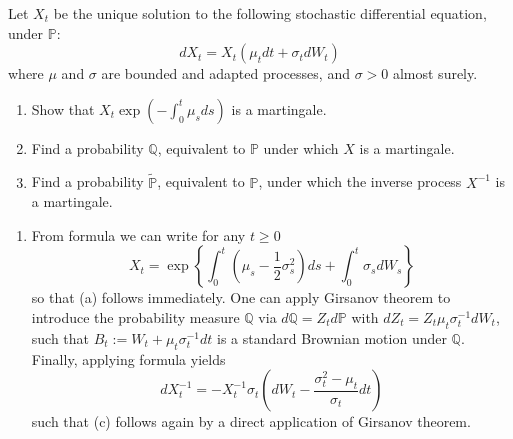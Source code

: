 \documentclass[12pt,a4paper]{exam}
\begin{document}
\begin{questions}
\begin{solution}
\begin{solution}
\question Let $X_t$ be the unique solution to the following stochastic differential equation, under $\mathbb{P}$:
\begin{equation*}
dX_t = X_t(\mu_t dt + \sigma_t dW_t)
\end{equation*}
where $\mu$ and $\sigma$ are bounded and adapted processes, and $\sigma >0$ almost surely.
\begin{enumerate}[label=(\alph*),font=\itshape]
\item Show that $X_t\exp(-\int_0^t \mu_s ds)$ is a martingale.
\item Find a probability $\mathbb{Q}$, equivalent to $\mathbb{P}$ under which $X$ is a martingale.
\item Find a probability $\tilde{\mathbb{P}}$, equivalent to $\mathbb{P}$, under which the inverse process $X^{-1}$ is a martingale.
\end{enumerate}
\fillwithlines{3cm}
\begin{solution}
\begin{enumerate}[label=(\alph*),font=\itshape]
\item From \ito formula we can write for any $t\geq 0$
\begin{equation*}
X_t = \exp\left\{\int_0^t\left(\mu_s - \frac{1}{2}\sigma_s^2\right)ds + \int_0^t\sigma_s dW_s\right\}
\end{equation*}
so that (a) follows immediately. One can apply Girsanov theorem to introduce the probability measure $\mathbb{Q}$ via $d\mathbb{Q}=Z_t d\mathbb{P}$ with $dZ_t = Z_t\mu_t \sigma_t^{-1}dW_t$, such that $B_t := W_t +\mu_t\sigma^{-1}_t dt$ is a standard Brownian motion under $\mathbb{Q}$.
Finally, applying \ito formula yields
\begin{equation*}
dX^{-1}_t = -X^{-1}_t \sigma_t  \left( dW_t - \frac{\sigma_t^2 - \mu_t}{\sigma_t}dt\right)
\end{equation*}
such that (c) follows again by a direct application of Girsanov theorem.
\end{enumerate}
\end{solution}


\end{solution}
\end{solution}
\end{questions}
\end{document}
